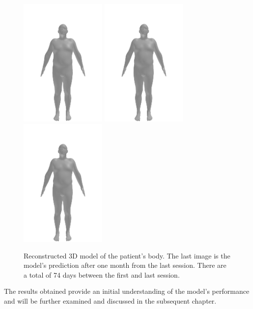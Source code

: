 \begin{figure}[h]
    \includegraphics[width=120pt]{files/patient_2/2_10}
    \includegraphics[width=120pt]{files/patient_2/2_11}
    \linebreak
    \includegraphics[width=120pt]{files/patient_2/2_predicted}
    \caption[Reconstructed 3D model of the patient's body]{Reconstructed 3D model of the patient's body. The last image is the model's prediction after one month from the last session. There are a total of 74 days between the first and last session.}
    \label{fig:patient-body-model}
\end{figure}

The results obtained provide an initial understanding of the model's
performance and will be further examined and discussed in the subsequent
chapter.